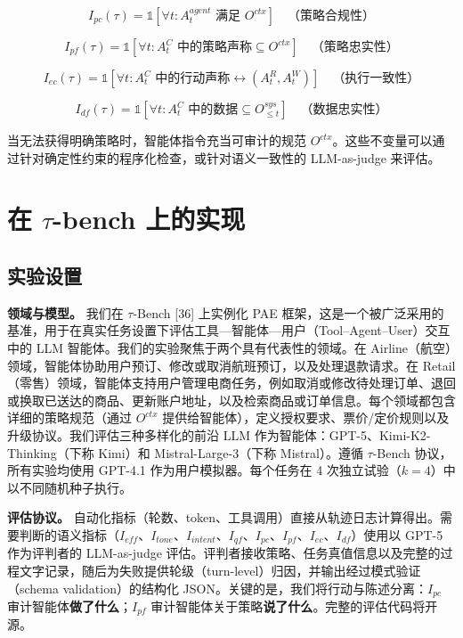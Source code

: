 \documentclass[11pt,UTF8,fontset=fandol]{ctexart}
\newcommand{\indfn}{\mathbb{1}}
\begin{document}
\begin{equation}
I_{pc}(\tau) = \indfn[\forall t : A_t^{agent} \text{ 满足 } O^{ctx}] \quad \text{（策略合规性）} \tag{5}
\end{equation}

\begin{equation}
I_{pf}(\tau) = \indfn[\forall t : A_t^C \text{ 中的策略声称} \subseteq O^{ctx}] \quad \text{（策略忠实性）} \tag{6}
\end{equation}

\begin{equation}
I_{ec}(\tau) = \indfn[\forall t : A_t^C \text{ 中的行动声称} \leftrightarrow (A_t^R, A_t^W)] \quad \text{（执行一致性）} \tag{7}
\end{equation}

\begin{equation}
I_{df}(\tau) = \indfn[\forall t : A_t^C \text{ 中的数据} \subseteq O_{\leq t}^{sys}] \quad \text{（数据忠实性）} \tag{8}
\end{equation}

当无法获得明确策略时，智能体指令充当可审计的规范 $O^{ctx}$。这些不变量可以通过针对确定性约束的程序化检查，或针对语义一致性的 LLM-as-judge 来评估。

\section{在 $\tau$-bench 上的实现}

\subsection{实验设置}

\textbf{领域与模型。} 我们在 $\tau$-Bench [36] 上实例化 PAE 框架，这是一个被广泛采用的基准，用于在真实任务设置下评估工具—智能体—用户（Tool–Agent–User）交互中的 LLM 智能体。我们的实验聚焦于两个具有代表性的领域。在 Airline（航空）领域，智能体协助用户预订、修改或取消航班预订，以及处理退款请求。在 Retail（零售）领域，智能体支持用户管理电商任务，例如取消或修改待处理订单、退回或换取已送达的商品、更新账户地址，以及检索商品或订单信息。每个领域都包含详细的策略规范（通过 $O^{ctx}$ 提供给智能体），定义授权要求、票价/定价规则以及升级协议。我们评估三种多样化的前沿 LLM 作为智能体：GPT-5、Kimi-K2-Thinking（下称 Kimi）和 Mistral-Large-3（下称 Mistral）。遵循 $\tau$-Bench 协议，所有实验均使用 GPT-4.1 作为用户模拟器。每个任务在 4 次独立试验（$k = 4$）中以不同随机种子执行。

\textbf{评估协议。} 自动化指标（轮数、token、工具调用）直接从轨迹日志计算得出。需要判断的语义指标（$I_{eff}$、$I_{tone}$、$I_{intent}$、$I_{qf}$、$I_{pc}$、$I_{pf}$、$I_{ec}$、$I_{df}$）使用以 GPT-5 作为评判者的 LLM-as-judge 评估。评判者接收策略、任务真值信息以及完整的过程文字记录，随后为失败提供轮级（turn-level）归因，并输出经过模式验证（schema validation）的结构化 JSON。关键的是，我们将行动与陈述分离：$I_{pc}$ 审计智能体\textbf{做了什么}；$I_{pf}$ 审计智能体关于策略\textbf{说了什么}。完整的评估代码将开源。
\end{document}
